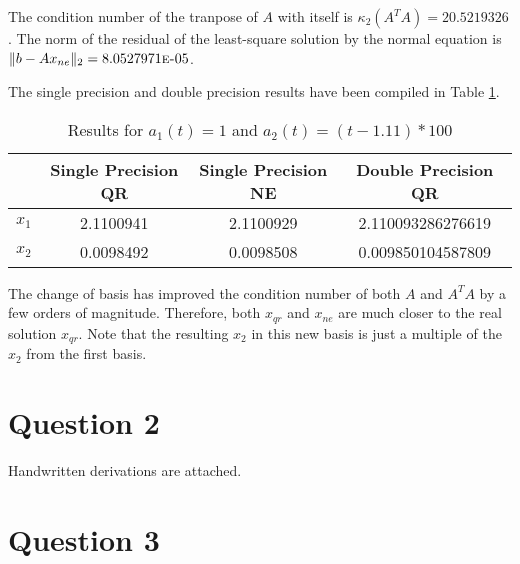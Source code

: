 \documentclass[letterpaper,12pt,]{article}
\begin{document}
The condition number of the tranpose of $A$ with itself is $\kappa_{2}(A^{T}A) = 20.5219326$. The norm of the residual of the least-square solution by the normal equation is $\|b-Ax_{ne}\|_2 = 8.0527971\text{\sc{e}-}05$.

The single precision and double precision results have been compiled in Table \ref{tab:r2}.

\begin{table}[h]
\centering
\begin{tabular}{cccc} \toprule
    {} & {Single Precision QR} & {Single Precision NE} & {Double Precision QR}\\ \midrule
    $x_1$ &	2.1100941 & 2.1100929 & 2.110093286276619\\
    $x_2$ &	0.0098492 & 0.0098508 & 0.009850104587809\\
\bottomrule
\end{tabular}
\caption{Results for $a_{1}(t) = 1$ and $a_{2}(t) = (t-1.11) \ast 100$}
\label{tab:r2}
\end{table}

The change of basis has improved the condition number of both $A$ and $A^TA$ by a few orders of magnitude. Therefore, both $x_{qr}$ and $x_{ne}$ are much closer to the real solution $x_{qr}$. Note that the resulting $x_2$ in this new basis is just a multiple of the $x_2$ from the first basis.

\section*{Question 2}

Handwritten derivations are attached.

\section*{Question 3}
\end{document}
